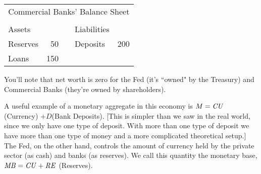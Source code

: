 \documentclass[letterpaper,12pt]{article}
\newcommand{\CU}{\mbox{\em CU\/}}
\newcommand{\RE}{\mbox{\em RE\/}}
\newcommand{\MB}{\mbox{\em MB\/}}
\begin{document}
%
\begin{center}
\begin{tabular}{lrclr}
\multicolumn{5}{c}{Commercial Banks' Balance Sheet}             \\
                                                        &       \\
                    Assets      &&&          Liabilities        \\
                    Reserves    &  50    &&  Deposits   &200    \\
                    Loans       & 150    &&             &       \\
\end{tabular}
\end{center}
%
You'll note that net worth is zero for the Fed (it's ``owned" by the Treasury) and Commercial
Banks (they're owned by shareholders).

     A useful example of a monetary aggregate in this economy is $M = \CU$
(Currency) $+ D $(Bank Deposits).  [This is simpler than we saw in the real world, since we only
have one type of deposit.  With more than one type of deposit we have more than one type of money
and a more complicated theoretical setup.]  The Fed, on the other hand, controls the amount of
currency held by the private sector (as cash) and banks (as reserves).  We call this quantity the
monetary base, $\MB = \CU + \RE $ (Reserves).
\end{document}
